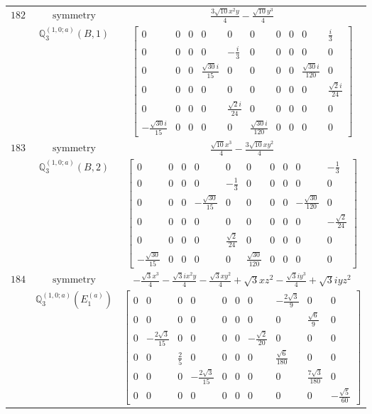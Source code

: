 \documentclass[fleqn,8pt,landscape]{jsarticle}
\begin{document}
\begin{longtable}{ccc}
$ 182 $ & $ \text{symmetry} $ & $ \frac{3 \sqrt{10} x^{2} y}{4} - \frac{\sqrt{10} y^{3}}{4} $ \\
$  $ & $ \mathbb{Q}_{3}^{(1,0;a)}(B,1) $ & $ \begin{bmatrix} 0 & 0 & 0 & 0 & 0 & 0 & 0 & 0 & 0 & \frac{i}{3} \\ 0 & 0 & 0 & 0 & - \frac{i}{3} & 0 & 0 & 0 & 0 & 0 \\ 0 & 0 & 0 & \frac{\sqrt{30} i}{15} & 0 & 0 & 0 & 0 & \frac{\sqrt{30} i}{120} & 0 \\ 0 & 0 & 0 & 0 & 0 & 0 & 0 & 0 & 0 & \frac{\sqrt{2} i}{24} \\ 0 & 0 & 0 & 0 & \frac{\sqrt{2} i}{24} & 0 & 0 & 0 & 0 & 0 \\ - \frac{\sqrt{30} i}{15} & 0 & 0 & 0 & 0 & \frac{\sqrt{30} i}{120} & 0 & 0 & 0 & 0 \end{bmatrix} $ \\ \hline
$ 183 $ & $ \text{symmetry} $ & $ \frac{\sqrt{10} x^{3}}{4} - \frac{3 \sqrt{10} x y^{2}}{4} $ \\
$  $ & $ \mathbb{Q}_{3}^{(1,0;a)}(B,2) $ & $ \begin{bmatrix} 0 & 0 & 0 & 0 & 0 & 0 & 0 & 0 & 0 & - \frac{1}{3} \\ 0 & 0 & 0 & 0 & - \frac{1}{3} & 0 & 0 & 0 & 0 & 0 \\ 0 & 0 & 0 & - \frac{\sqrt{30}}{15} & 0 & 0 & 0 & 0 & - \frac{\sqrt{30}}{120} & 0 \\ 0 & 0 & 0 & 0 & 0 & 0 & 0 & 0 & 0 & - \frac{\sqrt{2}}{24} \\ 0 & 0 & 0 & 0 & \frac{\sqrt{2}}{24} & 0 & 0 & 0 & 0 & 0 \\ - \frac{\sqrt{30}}{15} & 0 & 0 & 0 & 0 & \frac{\sqrt{30}}{120} & 0 & 0 & 0 & 0 \end{bmatrix} $ \\ \hline
$ 184 $ & $ \text{symmetry} $ & $ - \frac{\sqrt{3} x^{3}}{4} - \frac{\sqrt{3} i x^{2} y}{4} - \frac{\sqrt{3} x y^{2}}{4} + \sqrt{3} x z^{2} - \frac{\sqrt{3} i y^{3}}{4} + \sqrt{3} i y z^{2} $ \\
$  $ & $ \mathbb{Q}_{3}^{(1,0;a)}(E_{1}^{(a)}) $ & $ \begin{bmatrix} 0 & 0 & 0 & 0 & 0 & 0 & 0 & - \frac{2 \sqrt{3}}{9} & 0 & 0 \\ 0 & 0 & 0 & 0 & 0 & 0 & 0 & 0 & \frac{\sqrt{6}}{9} & 0 \\ 0 & - \frac{2 \sqrt{3}}{15} & 0 & 0 & 0 & 0 & - \frac{\sqrt{2}}{20} & 0 & 0 & 0 \\ 0 & 0 & \frac{2}{5} & 0 & 0 & 0 & 0 & \frac{\sqrt{6}}{180} & 0 & 0 \\ 0 & 0 & 0 & - \frac{2 \sqrt{3}}{15} & 0 & 0 & 0 & 0 & \frac{7 \sqrt{3}}{180} & 0 \\ 0 & 0 & 0 & 0 & 0 & 0 & 0 & 0 & 0 & - \frac{\sqrt{5}}{60} \end{bmatrix} $ \\ \hline

\end{longtable}
\end{document}
